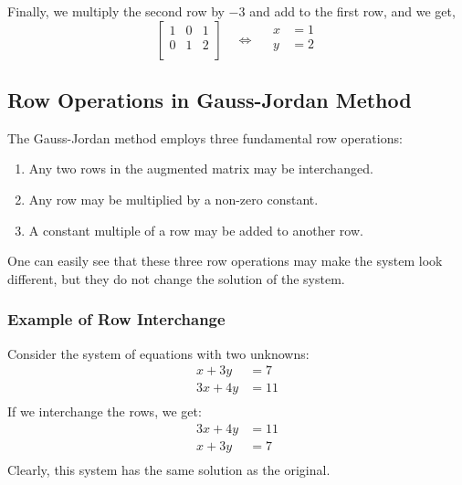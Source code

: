 \begin{solution}
\[    \]
    Finally, we multiply the second row by $-3$ and add to the first row, and we get,
    \[
        \left[
            \begin{array}{cc|c}
                1 & 0 & 1 \\
                0 & 1 & 2 \\
            \end{array}
            \right]
        \quad \Leftrightarrow \quad
        \begin{aligned}
            x & = 1 \\
            y & = 2 \\
        \end{aligned}
    \]
\end{solution}


\subsection{Row Operations in Gauss-Jordan Method}
The Gauss-Jordan method employs three fundamental row operations:

\begin{enumerate}
    \item Any two rows in the augmented matrix may be interchanged.
    \item Any row may be multiplied by a non-zero constant.
    \item A constant multiple of a row may be added to another row.
\end{enumerate}

One can easily see that these three row operations may make the system look different, but they do not change the solution of the system.

\subsubsection*{Example of Row Interchange}
Consider the system of equations with two unknowns:
\[
    \begin{aligned}
        x + 3y  & = 7  \\
        3x + 4y & = 11 \\
    \end{aligned}
\]
If we interchange the rows, we get:
\[
    \begin{aligned}
        3x + 4y & = 11 \\
        x + 3y  & = 7  \\
    \end{aligned}
\]
Clearly, this system has the same solution as the original.

